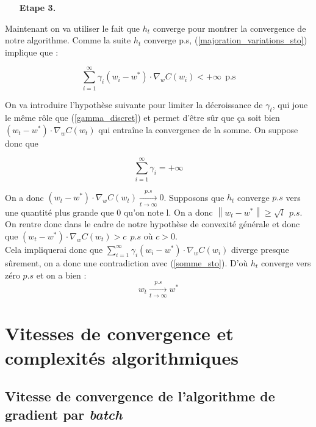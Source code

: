 \documentclass{article}
\begin{document}
\begin{itemize}
    \item[\textbf{Etape 3.}]
\end{itemize}
\bigskip

Maintenant on va utiliser le fait que $h_t$ converge pour montrer la convergence de notre algorithme.
Comme la suite $h_t$ converge p.s, (\ref{majoration_variations_sto}) implique que :

\begin{equation}\label{somme_sto}
    \sum_{i=1}^\infty\gamma_i(w_i-w^*)\cdot\nabla_wC(w_i) < +\infty ~~ \text{p.s}
\end{equation}
    
On va introduire l'hypothèse suivante pour limiter la décroissance de $\gamma_t$, qui joue le même rôle que (\ref{gamma_discret}) et permet d'être sûr que ça soit bien $(w_t-w^*) \cdot \nabla_wC(w_t)$ qui entraîne la convergence de la somme. On suppose donc que 

\begin{equation}\label{gamma_sto}
    \sum_{i=1}^\infty\gamma_i = +\infty
\end{equation}

On a donc $(w_t - w^*) \cdot \nabla_wC(w_t) \underset{t\to\infty}{\overset{p.s}{\longrightarrow }}0$. Supposons que $h_t$ converge $p.s$ vers une quantité plus grande que 0 qu'on note l. On a donc $\left\|w_t-w^*\right\|\geq\sqrt{l}~~p.s$. On rentre donc dans le cadre de notre hypothèse de convexité générale et donc que $(w_t - w^*) \cdot \nabla_wC(w_t)>c~~p.s$ où $c>0$.\\ 
Cela impliquerai donc que $\sum_{i=1}^\infty\gamma_i(w_i-w^*)\cdot\nabla_wC(w_i)$ diverge presque sûrement, on a donc une contradiction avec (\ref{somme_sto}). D'où $h_t$ converge vers zéro $p.s$ et on a bien :
\begin{equation*}
    w_t\underset{t\to\infty}{\overset{p.s}{\longrightarrow}}w^*
\end{equation*}

\section{Vitesses de convergence et complexités algorithmiques}

\subsection{Vitesse de convergence de l'algorithme de gradient par \emph{batch}}
\end{document}
